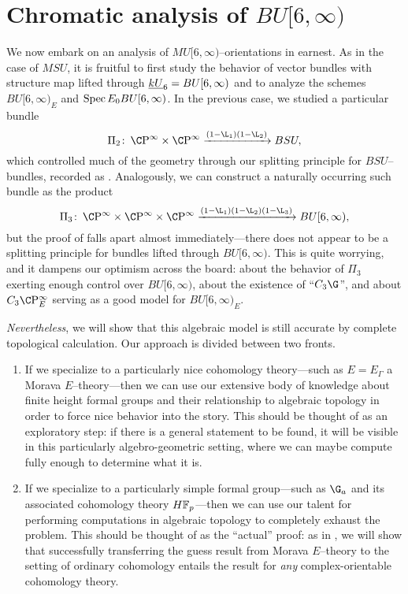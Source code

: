 \section{Chromatic analysis of \texorpdfstring{$BU[6, \infty)$}{BU[6, oo)}}\label{ChromaticKUCoopnsSection}

We now embark on an analysis of $MU[6, \infty)$--orientations in earnest.  As in the case of $MSU$, it is fruitful to first study the behavior of vector bundles with structure map lifted through $\underline{\smash{kU}}_{6} = BU[6, \infty)$ and to analyze the schemes $BU[6, \infty)_E$ and $\operatorname{Spec} E_0 BU[6, \infty)$.  In the previous case, we studied a particular bundle \[\Pi_2\co \CP^\infty \times \CP^\infty \xrightarrow{(1 - \L_1)(1 - \L_2)} BSU,\] which controlled much of the geometry through our splitting principle for $BSU$--bundles, recorded as .  Analogously, we can construct a naturally occurring such bundle as the product \[\Pi_3\co \CP^\infty \times \CP^\infty \times \CP^\infty \xrightarrow{(1 - \L_1)(1 - \L_2)(1 - \L_3)} BU[6, \infty),\] but the proof of  falls apart almost immediately---there does not appear to be a splitting principle for bundles lifted through $BU[6, \infty)$.  This is quite worrying, and it dampens our optimism across the board: about the behavior of $\Pi_3$ exerting enough control over $BU[6, \infty)$, about the existence of ``$C_3 \G$'', and about $C_3 \CP^\infty_E$ serving as a good model for $BU[6, \infty)_E$.

\emph{Nevertheless}, we will show that this algebraic model is still accurate by complete topological calculation.  Our approach is divided between two fronts.
\begin{enumerate}
    \item If we specialize to a particularly nice cohomology theory---such as $E = E_\Gamma$ a Morava $E$--theory---then we can use our extensive body of knowledge about finite height formal groups and their relationship to algebraic topology in order to force nice behavior into the story.  This should be thought of as an exploratory step: if there is a general statement to be found, it will be visible in this particularly algebro-geometric setting, where we can maybe compute fully enough to determine what it is.
    \item If we specialize to a particularly simple formal group---such as $\G_a$ and its associated cohomology theory $\HFp$---then we can use our talent for performing computations in algebraic topology to completely exhaust the problem.  This should be thought of as the ``actual'' proof: as in , we will show that successfully transferring the guess result from Morava $E$--theory to the setting of ordinary cohomology entails the result for \emph{any} complex-orientable cohomology theory.
\end{enumerate}

